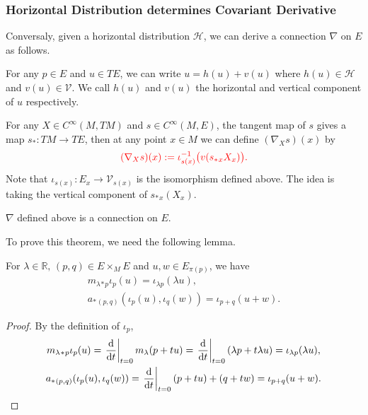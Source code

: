 \subsubsection*{Horizontal Distribution determines Covariant Derivative}
Conversaly, given a horizontal distribution $\mathcal{H}$, we can derive a connection $\nabla$ on $E$ as follows. 
\begin{definition}
    For any $p\in E$ and $u\in TE$, we can write $u = h(u) + v(u)$ where 
    $h(u)\in \mathcal{H}$ and $v(u)\in \mathcal{V}$. We call $h(u)$ and $v(u)$ 
    the horizontal and vertical component of $u$ respectively.
\end{definition}
For any $X\in C^\infty(M,TM)$ and $s\in C^\infty(M,E)$, the tangent map of $s$ gives a map $s_*: TM \to TE$, 
then at any point $x\in M$ we can define $(\nabla_X s)(x)$ by
\begin{equation*}
    \textcolor{red}{(\nabla_X s)(x) := \iota_{s(x)}^{-1}\big(v(s_*{}_x X_x)\big).}
\end{equation*}
Note that $\iota_{s(x)}: E_x \to \mathcal{V}_{s(x)}$ is the isomorphism defined above. 
The idea is taking the vertical component of $s_*{}_x(X_x)$.
\begin{theorem}\label{thm:connection-from-horizontal-distribution}
    $\nabla$ defined above is a connection on $E$.
\end{theorem}
To prove this theorem, we need the following lemma.
\begin{lemma}\label{lem:tangent-map-of-linear-ops-acts-on-vertical-bundle}
    For $\lambda\in\mathbb{R},\,(p,q)\in E\times_M E$ and $u,w\in E_{\pi(p)}$, we have  
    \begin{gather*}
        m_{\lambda}{}_*{}_p \iota_p(u) = \iota_{\lambda p}(\lambda u), \\
        a_*{}_{(p,q)}(\iota_p(u),\iota_q(w)) = \iota_{p+q}(u+w).
    \end{gather*}
\end{lemma}
\begin{proof}
    By the definition of $\iota_p$, 
    \begin{gather*}
        m_{\lambda}{}_*{}_p \iota_p(u) = \left.\frac{{\rm d} }{{\rm d} t}\right|_{t=0} m_{\lambda}(p + t u) 
        = \left.\frac{{\rm d} }{{\rm d} t}\right|_{t=0} (\lambda p + t \lambda u) = \iota_{\lambda p}(\lambda u), \\
        a_*{}_{(p,q)}(\iota_p(u),\iota_q(w)) = \left.\frac{{\rm d} }{{\rm d} t}\right|_{t=0} (p + t u) + (q + t w) 
        = \iota_{p+q}(u+w). \qedhere
    \end{gather*}
\end{proof}

